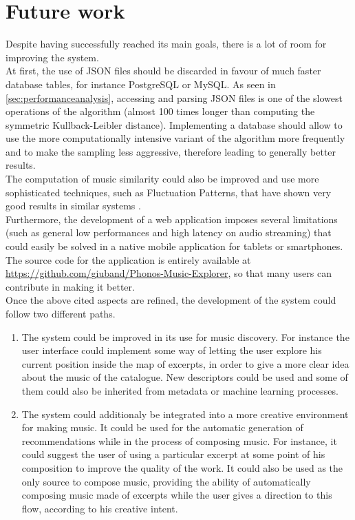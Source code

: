 \section{Future work}
Despite having successfully reached its main goals, there is a lot of room for improving the system. \\
At first, the use of JSON files should be discarded in favour of much faster database tables, for instance PostgreSQL or MySQL. As seen in \ref{sec:performanceanalysis}, accessing and parsing JSON files is one of the slowest operations of the algorithm (almost 100 times longer than computing the symmetric Kullback-Leibler distance). Implementing a database should allow to use the more computationally intensive variant of the algorithm more frequently and to make the sampling less aggressive, therefore leading to generally better results. \\
The computation of music similarity could also be improved and use more sophisticated techniques, such as Fluctuation Patterns, that have shown very good results in similar systems \cite{pohle09}. \\
Furthermore, the development of a web application imposes several limitations (such as general low performances and high latency on audio streaming) that could easily be solved in a native mobile application for tablets or smartphones. \\
The source code for the application is entirely available at \url{https://github.com/giuband/Phonos-Music-Explorer}, so that many users can contribute in making it better.\\
Once the above cited aspects are refined, the development of the system could follow two different paths.
\begin{enumerate}
\item The system could be improved in its use for music discovery. For instance the user interface could implement some way of letting the user explore his current position inside the map of excerpts, in order to give a more clear idea about the music of the catalogue. New descriptors could be used and some of them could also be inherited from metadata or machine learning processes. 
\item The system could additionaly be integrated into a more creative environment for making music. It could be used for the automatic generation of recommendations while in the process of composing music. For instance, it could suggest the user of using a particular excerpt at some point of his composition to improve the quality of the work. It could also be used as the only source to compose music, providing the ability of automatically composing music made of excerpts while the user gives a direction to this flow, according to his creative intent. 
\end{enumerate}
